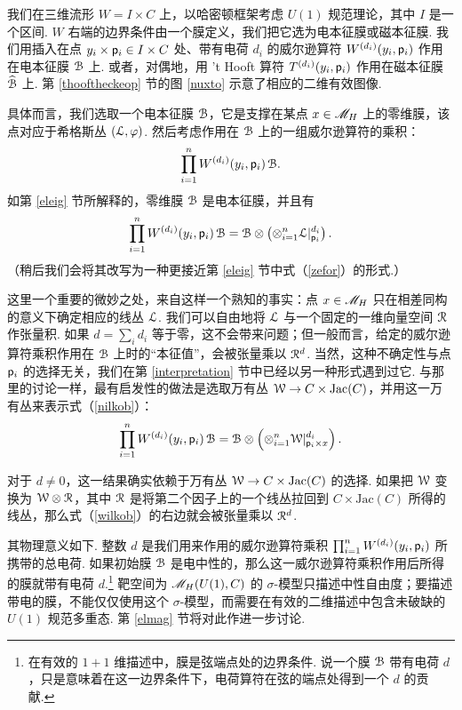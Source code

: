 我们在三维流形 $W=I\times C$ 上，以哈密顿框架考虑 $U(1)$ 规范理论，其中 $I$ 是一个区间. $W$ 右端的边界条件由一个膜定义，我们把它选为电本征膜或磁本征膜. 我们用插入在点 $y_i\times \pp_i\in I\times C$ 处、带有电荷 $d_i$ 的威尔逊算符 $W^{(d_i)}(y_i,\pp_i)$ 作用在电本征膜 ${\cal B}$ 上. 或者，对偶地，用 't Hooft 算符 $T^{(d_i)}(y_i,\pp_i)$ 作用在磁本征膜 $\hat{\cal B}$ 上. 第 \ref{thooftheckeop} 节的图 \ref{nuxto} 示意了相应的二维有效图像.

具体而言，我们选取一个电本征膜 ${\cal B}$，它是支撑在某点 $x\in \MH$ 上的零维膜，该点对应于希格斯丛 $({\cal L},\varphi)$. 然后考虑作用在 ${\cal B}$ 上的一组威尔逊算符的乘积：
\begin{equation}\label{pilkob}{\prod_{i=1}^n} \,W^{(d_i)}(y_i,\pp_i)\,{\cal B}.\end{equation}
如第 \ref{eleig} 节所解释的，零维膜 ${\cal B}$ 是电本征膜，并且有
\begin{equation}\label{nilkob}{\prod_{i=1}^n} \,W^{(d_i)}(y_i,\pp_i)\,{\cal B}=
{\cal B}\otimes\left(\otimes_{i=1}^n{\cal \L}|_{\pp_i}^{d_i}\right).\end{equation}
（稍后我们会将其改写为一种更接近第 \ref{eleig} 节中式（\ref{zefor}）的形式.）

这里一个重要的微妙之处，来自这样一个熟知的事实：点 $x\in \MH$ 只在相差同构的意义下确定相应的线丛 ${\cal L}$. 我们可以自由地将 ${\cal L}$ 与一个固定的一维向量空间 ${\cal R}$ 作张量积. 如果 $d=\sum_id_i$ 等于零，这不会带来问题；但一般而言，给定的威尔逊算符乘积作用在 ${\cal B}$ 上时的“本征值”，会被张量乘以 ${\cal R}^d$. 当然，这种不确定性与点 $\pp_i$ 的选择无关，我们在第 \ref{interpretation} 节中已经以另一种形式遇到过它. 与那里的讨论一样，最有启发性的做法是选取万有丛 $\W\to C\times {\mathrm{Jac}}(C)$，并用这一万有丛来表示式（\ref{nilkob}）：
\begin{equation}\label{wilkob} {\prod_{i=1}^n} \,W^{(d_i)}(y_i,\pp_i)\,{\cal B}=
{\cal B}\otimes\left(\otimes_{i=1}^n{\W}|_{\pp_i\times x}^{d_i}\right).\end{equation}

对于 $d\not=0$，这一结果确实依赖于万有丛 $\W\to C\times {\mathrm{Jac}}(C)$ 的选择. 如果把 $\W$ 变换为 $\W\otimes \RR$，其中 $\RR$ 是将第二个因子上的一个线丛拉回到 $C\times \mathrm{Jac}(C)$ 所得的线丛，那么式（\ref{wilkob}）的右边就会被张量乘以 $\RR^d$.

其物理意义如下. 整数 $d$ 是我们用来作用的威尔逊算符乘积 ${\prod_{i=1}^n} \,W^{(d_i)}(y_i,\pp_i)$ 所携带的总电荷. 如果初始膜 $\B$ 是电中性的，那么这一威尔逊算符乘积作用后所得的膜就带有电荷 $d$.\footnote{在有效的 $1+1$ 维描述中，膜是弦端点处的边界条件. 说一个膜 $\B$ 带有电荷 $d$，只是意味着在这一边界条件下，电荷算符在弦的端点处得到一个 $d$ 的贡献.} 靶空间为 $\MH(U(1),C)$ 的 $\sigma$-模型只描述中性自由度；要描述带电的膜，不能仅仅使用这个 $\sigma$-模型，而需要在有效的二维描述中包含未破缺的 $U(1)$ 规范多重态. 第 \ref{elmag} 节将对此作进一步讨论.

